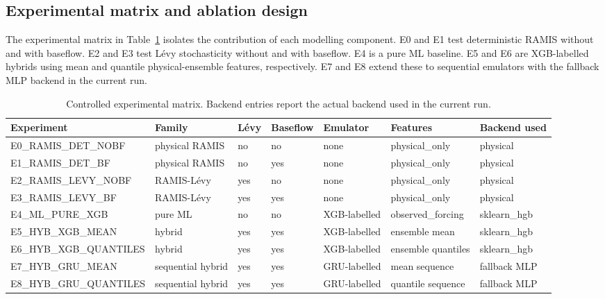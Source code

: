 \documentclass[a4paper,fleqn]{cas-sc}
\begin{document}
\subsection{Experimental matrix and ablation design}
\label{subsec:matrix}

The experimental matrix in Table~\ref{tab:experiment-matrix} isolates
the contribution of each modelling component. E0 and E1 test
deterministic RAMIS without and with baseflow. E2 and E3 test L\'{e}vy
stochasticity without and with baseflow. E4 is a pure ML baseline.
E5 and E6 are XGB-labelled hybrids using mean and quantile
physical-ensemble features, respectively. E7 and E8 extend these to
sequential emulators with the fallback MLP backend in the current run.

\begin{table}[t]
\caption{Controlled experimental matrix. Backend entries report the
actual backend used in the current run.}
\label{tab:experiment-matrix}
\centering
\small
\begin{tabular*}{\textwidth}{@{\extracolsep{\fill}}lllllll@{}}
\toprule
Experiment & Family & L\'{e}vy & Baseflow & Emulator & Features
  & Backend used \\
\midrule
E0\_RAMIS\_DET\_NOBF   & physical RAMIS & no  & no  & none
  & physical\_only & physical \\
E1\_RAMIS\_DET\_BF     & physical RAMIS & no  & yes & none
  & physical\_only & physical \\
E2\_RAMIS\_LEVY\_NOBF  & RAMIS-L\'{e}vy & yes & no  & none
  & physical\_only & physical \\
E3\_RAMIS\_LEVY\_BF    & RAMIS-L\'{e}vy & yes & yes & none
  & physical\_only & physical \\
E4\_ML\_PURE\_XGB      & pure ML        & no  & no  & XGB-labelled
  & observed\_forcing & sklearn\_hgb \\
E5\_HYB\_XGB\_MEAN     & hybrid         & yes & yes & XGB-labelled
  & ensemble mean & sklearn\_hgb \\
E6\_HYB\_XGB\_QUANTILES & hybrid        & yes & yes & XGB-labelled
  & ensemble quantiles & sklearn\_hgb \\
E7\_HYB\_GRU\_MEAN     & sequential hybrid & yes & yes & GRU-labelled
  & mean sequence & fallback MLP \\
E8\_HYB\_GRU\_QUANTILES & sequential hybrid & yes & yes & GRU-labelled
  & quantile sequence & fallback MLP \\
\bottomrule
\end{tabular*}
\end{table}
\end{document}
